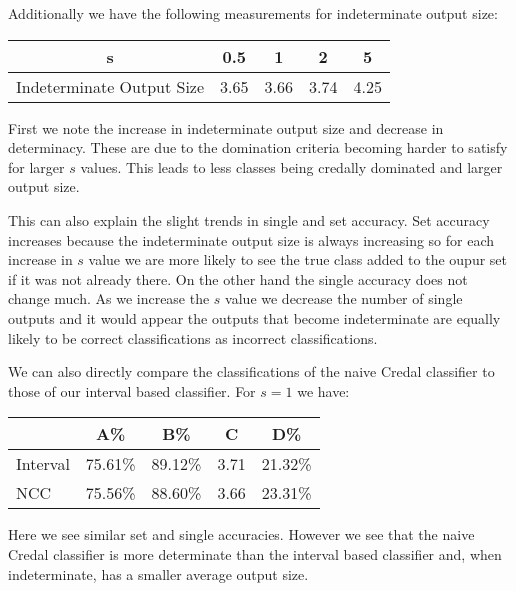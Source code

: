 Additionally we have the following measurements for indeterminate output size:
\begin{center}
\begin{tabular}{c|c c c c}
s & 0.5 & 1 & 2 & 5 \\
\hline
Indeterminate Output Size & 3.65 & 3.66 & 3.74 & 4.25
\end{tabular}
\end{center}

First we note the increase in indeterminate output size and decrease in determinacy.
These are due to the domination criteria becoming harder to satisfy for larger $s$ values.
This leads to less classes being credally dominated and larger output size.

This can also explain the slight trends in single and set accuracy.
Set accuracy increases because the indeterminate output size is always increasing so for each increase in $s$ value we are more likely to see the true class added to the oupur set if it was not already there.
On the other hand the single accuracy does not change much.
As we increase the $s$ value we decrease the number of single outputs and it would appear the outputs that become indeterminate are equally likely to be correct classifications as incorrect classifications.

We can also directly compare the classifications of the naive Credal classifier to those of our interval based classifier. For $s=1$ we have:
\begin{center}
\begin{tabular}{l|c c c c}
         & A\%     & B\%     & C    & D\%     \\
\hline
Interval & 75.61\% & 89.12\% & 3.71 & 21.32\% \\
NCC      & 75.56\% & 88.60\% & 3.66 & 23.31\% \\
\end{tabular}
\end{center}
Here we see similar set and single accuracies.
However we see that the naive Credal classifier is more determinate than the interval based classifier and, when indeterminate, has a smaller average output size.
